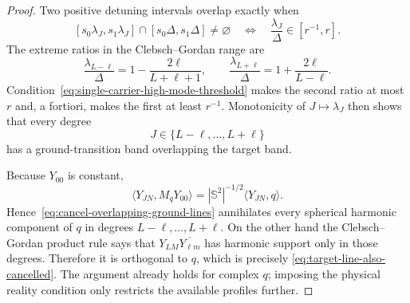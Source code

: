 \documentclass[11pt]{article}
\theoremstyle{remark}
\begin{document}
\begin{proof}
Two positive detuning intervals overlap exactly when
\[
 [s_0\lambda_J,s_1\lambda_J]\cap[s_0\Delta,s_1\Delta]\neq\varnothing
 \quad\Longleftrightarrow\quad
 \frac{\lambda_J}{\Delta}\in[r^{-1},r].
\]
The extreme ratios in the Clebsch--Gordan range are
\begin{equation}
 \frac{\lambda_{L-\ell}}{\Delta}
 =1-\frac{2\ell}{L+\ell+1},
 \qquad
 \frac{\lambda_{L+\ell}}{\Delta}
 =1+\frac{2\ell}{L-\ell}.
 \label{eq:clebsch-gordan-extreme-gap-ratios}
\end{equation}
Condition~\eqref{eq:single-carrier-high-mode-threshold} makes the second
ratio at most $r$ and, a fortiori, makes the first at least $r^{-1}$.
Monotonicity of $J\mapsto\lambda_J$ then shows that every degree
\[
 J\in\{L-\ell,\ldots,L+\ell\}
\]
has a ground-transition band overlapping the target band.

Because $Y_{00}$ is constant,
\[
 \langle Y_{JN},M_qY_{00}\rangle
 =|\mathbb S^2|^{-1/2}\langle Y_{JN},q\rangle.
\]
Hence~\eqref{eq:cancel-overlapping-ground-lines} annihilates every spherical
harmonic component of $q$ in degrees $L-\ell,\ldots,L+\ell$.  On the other
hand the Clebsch--Gordan product rule says that
$Y_{LM}\overline{Y_{\ell m}}$ has harmonic support only in those degrees.
Therefore it is orthogonal to $q$, which is precisely
\eqref{eq:target-line-also-cancelled}.  The argument already holds for
complex $q$; imposing the physical reality condition only restricts the
available profiles further.
\end{proof}
\end{document}
